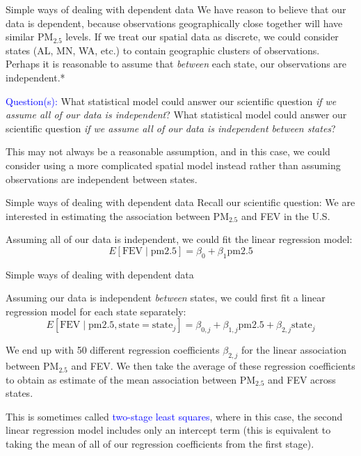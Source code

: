 \documentclass[10pt,t]{beamer}
\begin{document}
\begin{frame}{Simple ways of dealing with dependent data}
We have reason to believe that our data is dependent, because observations geographically close together will have similar $\text{PM}_{2.5}$ levels. If we treat our spatial data as discrete, we could consider states (AL, MN, WA, etc.) to contain geographic clusters of observations. Perhaps it is reasonable to assume that \textit{between} each state, our observations are independent.*

\vspace{0.3cm}

\textcolor{blue}{Question(s):} What statistical model could answer our scientific question \textit{if we assume all of our data is independent}? What statistical model could answer our scientific question \textit{if we assume all of our data is independent between states}?

\vspace{0.3cm}

\vfill

\tiny *This may not always be a reasonable assumption, and in this case, we could consider using a more complicated spatial model instead rather than assuming observations are independent between states.
\end{frame}

\begin{frame}{Simple ways of dealing with dependent data}
Recall our scientific question: We are interested in estimating the association between $\text{PM}_{2.5}$ and FEV in the U.S.

\vspace{0.3cm}

Assuming all of our data is independent, we could fit the linear regression model:
$$
E[\text{FEV} \mid \text{pm2.5}] = \beta_0 + \beta_1  \text{pm2.5}
$$

\end{frame}

\begin{frame}{Simple ways of dealing with dependent data}

Assuming our data is independent \textit{between} states, we could first fit a linear regression model for each state separately:
$$
E[\text{FEV} \mid \text{pm2.5}, \text{state} = \text{state}_j] = \beta_{0,j} + \beta_{1,j}  \text{pm2.5} + \beta_{2,j} \text{state}_j
$$

We end up with 50 different regression coefficients $\beta_{2,j}$ for the linear association between $\text{PM}_{2.5}$ and FEV. We then take the average of these regression coefficients to obtain as estimate of the mean association between $\text{PM}_{2.5}$ and FEV across states.

\vspace{0.3cm}

This is sometimes called \textcolor{blue}{two-stage least squares}, where in this case, the second linear regression model includes only an intercept term (this is equivalent to taking the mean of all of our regression coefficients from the first stage).

\end{frame}
\end{document}
